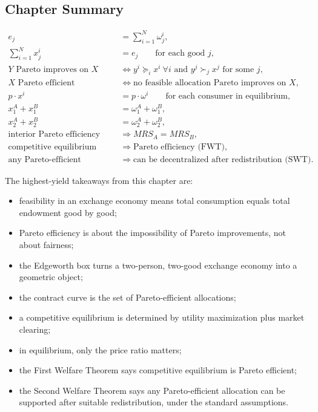 \subsection{Chapter Summary}

\begin{keyformula}[title={Key Formula: Lecture 9 Summary}]
\begin{align*}
e_j &= \sum_{i=1}^N \omega_j^i, \\
\sum_{i=1}^N x_j^i &= e_j
\qquad \text{for each good } j, \\
Y \text{ Pareto improves on } X
&\iff
y^i \succeq_i x^i \ \forall i
\text{ and } y^j \succ_j x^j \text{ for some } j, \\
X \text{ Pareto efficient}
&\iff
\text{no feasible allocation Pareto improves on } X, \\
p\cdot x^i &= p\cdot \omega^i
\qquad \text{for each consumer in equilibrium}, \\
x_1^A+x_1^B &= \omega_1^A+\omega_1^B, \\
x_2^A+x_2^B &= \omega_2^A+\omega_2^B, \\
\text{interior Pareto efficiency} &\Rightarrow MRS_A=MRS_B, \\
\text{competitive equilibrium} &\Rightarrow \text{Pareto efficiency (FWT)}, \\
\text{any Pareto-efficient allocation}
&\Rightarrow
\text{can be decentralized after redistribution (SWT)}.
\end{align*}
\end{keyformula}

\begin{examtip}
The highest-yield takeaways from this chapter are:
\begin{itemize}
    \item feasibility in an exchange economy means total consumption equals total endowment good by good;
    \item Pareto efficiency is about the impossibility of Pareto improvements, not about fairness;
    \item the Edgeworth box turns a two-person, two-good exchange economy into a geometric object;
    \item the contract curve is the set of Pareto-efficient allocations;
    \item a competitive equilibrium is determined by utility maximization plus market clearing;
    \item in equilibrium, only the price ratio matters;
    \item the First Welfare Theorem says competitive equilibrium is Pareto efficient;
    \item the Second Welfare Theorem says any Pareto-efficient allocation can be supported after suitable redistribution, under the standard assumptions.
\end{itemize}
\end{examtip}